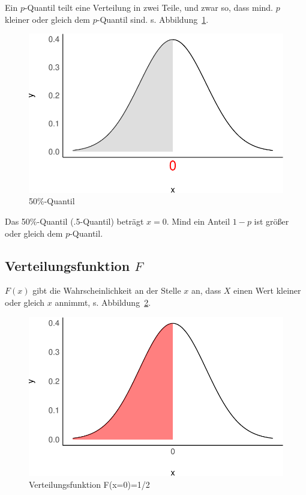 \documentclass[
  a4paper,
  DIV=11]{scrreprt}
\theoremstyle{definition}
\theoremstyle{remark}
\begin{document}
Ein \(p\)-Quantil teilt eine Verteilung in zwei Teile, und zwar so, dass
mind. \(p\) kleiner oder gleich dem \(p\)-Quantil sind. s.
Abbildung~\ref{fig-quantil}.

\begin{figure}

{\centering \includegraphics{./abschluss_files/figure-pdf/fig-quantil-1.pdf}

}

\caption{\label{fig-quantil}50\%-Quantil}

\end{figure}

Das 50\%-Quantil (.5-Quantil) beträgt \(x=0\). Mind ein Anteil \(1-p\)
ist größer oder gleich dem \(p\)-Quantil.

\hypertarget{verteilungsfunktion-f}{%
\subsection{\texorpdfstring{Verteilungsfunktion
\(F\)}{Verteilungsfunktion F}}\label{verteilungsfunktion-f}}

\(F(x)\) gibt die Wahrscheinlichkeit an der Stelle \(x\) an, dass \(X\)
einen Wert kleiner oder gleich \(x\) annimmt, s. Abbildung~\ref{fig-F}.

\begin{figure}

{\centering \includegraphics{./abschluss_files/figure-pdf/fig-F-1.pdf}

}

\caption{\label{fig-F}Verteilungsfunktion F(x=0)=1/2}

\end{figure}
\end{document}
